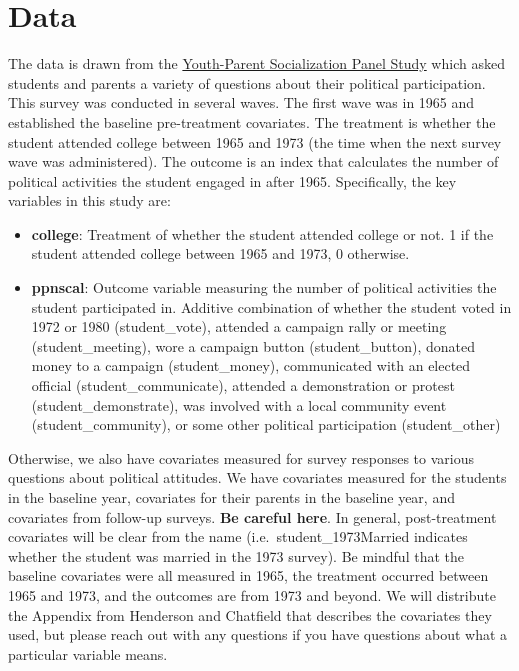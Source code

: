 \documentclass[
]{article}
\begin{document}
\hypertarget{data}{%
\section{Data}\label{data}}

The data is drawn from the
\href{https://www.icpsr.umich.edu/web/ICPSR/studies/4023/datadocumentation#}{Youth-Parent Socialization Panel Study}
which asked students and parents a variety of questions about their
political participation. This survey was conducted in several waves. The
first wave was in 1965 and established the baseline pre-treatment
covariates. The treatment is whether the student attended college
between 1965 and 1973 (the time when the next survey wave was
administered). The outcome is an index that calculates the number of
political activities the student engaged in after 1965. Specifically,
the key variables in this study are:

\begin{itemize}
    \item \textbf{college}: Treatment of whether the student attended college or not. 1 if the student attended college between 1965 and 1973, 0 otherwise.
    \item \textbf{ppnscal}: Outcome variable measuring the number of political activities the student participated in. Additive combination of whether the student voted in 1972 or 1980 (student\_vote), attended a campaign rally or meeting (student\_meeting), wore a campaign button (student\_button), donated money to a campaign (student\_money), communicated with an elected official (student\_communicate), attended a demonstration or protest (student\_demonstrate), was involved with a local community event (student\_community), or some other political participation (student\_other)
\end{itemize}

Otherwise, we also have covariates measured for survey responses to
various questions about political attitudes. We have covariates measured
for the students in the baseline year, covariates for their parents in
the baseline year, and covariates from follow-up surveys.
\textbf{Be careful here}. In general, post-treatment covariates will be
clear from the name (i.e.~student\_1973Married indicates whether the
student was married in the 1973 survey). Be mindful that the baseline
covariates were all measured in 1965, the treatment occurred between
1965 and 1973, and the outcomes are from 1973 and beyond. We will
distribute the Appendix from Henderson and Chatfield that describes the
covariates they used, but please reach out with any questions if you
have questions about what a particular variable means.
\end{document}
